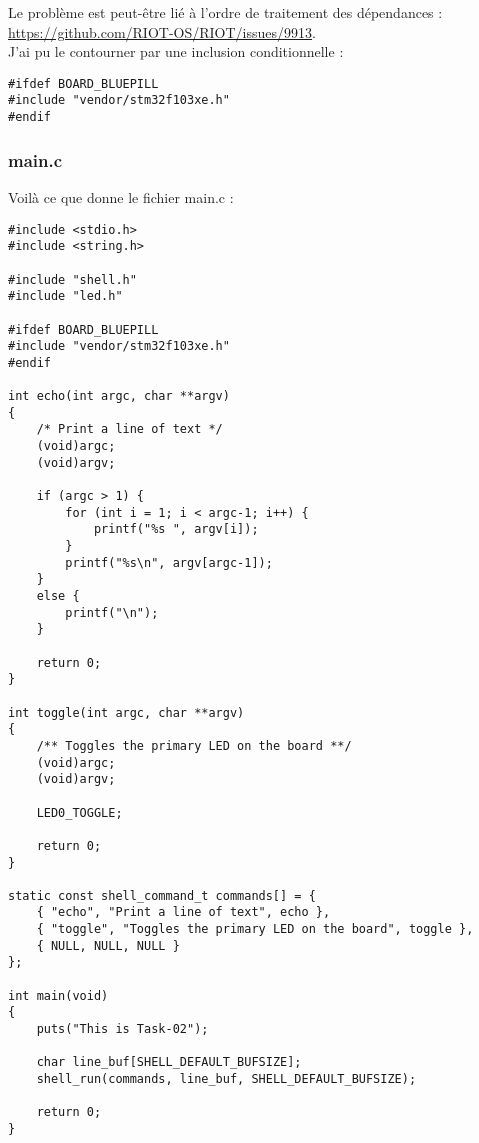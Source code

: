 Le problème est peut-être lié à l'ordre de traitement des dépendances
 : \url{https://github.com/RIOT-OS/RIOT/issues/9913}.\\
 
J'ai pu le contourner par une inclusion conditionnelle :
\begin{lstlisting}
#ifdef BOARD_BLUEPILL
#include "vendor/stm32f103xe.h"
#endif
\end{lstlisting}

\subsubsection{main.c}
Voilà ce que donne le fichier main.c :
\begin{lstlisting}
#include <stdio.h>
#include <string.h>

#include "shell.h"
#include "led.h"

#ifdef BOARD_BLUEPILL
#include "vendor/stm32f103xe.h"
#endif

int echo(int argc, char **argv)
{
    /* Print a line of text */
    (void)argc;
    (void)argv;
    
    if (argc > 1) {
    	for (int i = 1; i < argc-1; i++) {
	        printf("%s ", argv[i]);
	    }
		printf("%s\n", argv[argc-1]);
    }
    else {
		printf("\n");
	}
	
    return 0;
}

int toggle(int argc, char **argv)
{
	/** Toggles the primary LED on the board **/
    (void)argc;
    (void)argv;

	LED0_TOGGLE;
	
	return 0;
}

static const shell_command_t commands[] = {
    { "echo", "Print a line of text", echo },
    { "toggle", "Toggles the primary LED on the board", toggle },
    { NULL, NULL, NULL }
};

int main(void)
{
    puts("This is Task-02");

    char line_buf[SHELL_DEFAULT_BUFSIZE];
    shell_run(commands, line_buf, SHELL_DEFAULT_BUFSIZE);

    return 0;
}
\end{lstlisting}

